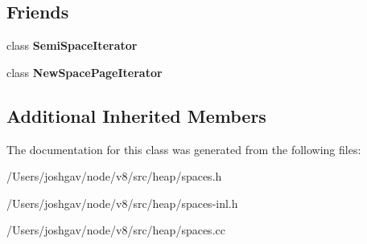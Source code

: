 \subsection*{Friends}
\begin{DoxyCompactItemize}
\item 
class {\bfseries Semi\+Space\+Iterator}\hypertarget{classv8_1_1internal_1_1_semi_space_a8b928629934cd4bbb42b079d8d3faf28}{}\label{classv8_1_1internal_1_1_semi_space_a8b928629934cd4bbb42b079d8d3faf28}

\item 
class {\bfseries New\+Space\+Page\+Iterator}\hypertarget{classv8_1_1internal_1_1_semi_space_a02d17e1b42313e4399611c825807adc6}{}\label{classv8_1_1internal_1_1_semi_space_a02d17e1b42313e4399611c825807adc6}

\end{DoxyCompactItemize}
\subsection*{Additional Inherited Members}


The documentation for this class was generated from the following files\+:\begin{DoxyCompactItemize}
\item 
/\+Users/joshgav/node/v8/src/heap/spaces.\+h\item 
/\+Users/joshgav/node/v8/src/heap/spaces-\/inl.\+h\item 
/\+Users/joshgav/node/v8/src/heap/spaces.\+cc\end{DoxyCompactItemize}

